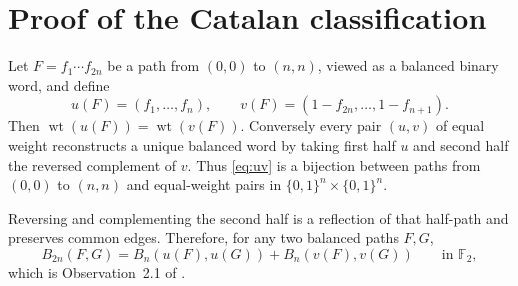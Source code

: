 \documentclass[11pt]{article}
\theoremstyle{definition}
\newcommand{\F}{\mathbb F}
\newcommand{\wt}{\operatorname{wt}}
\newcommand{\bits}{\{0,1\}}
\begin{document}
\section{Proof of the Catalan classification}

Let $F=f_1\cdots f_{2n}$ be a path from $(0,0)$ to $(n,n)$, viewed as a balanced binary word, and define
\begin{equation}\label{eq:uv}
 u(F)=(f_1,\ldots,f_n),\qquad
 v(F)=(1-f_{2n},\ldots,1-f_{n+1}).
\end{equation}
Then $\wt(u(F))=\wt(v(F))$.  Conversely every pair $(u,v)$ of equal weight reconstructs a unique balanced word by taking first half $u$ and second half the reversed complement of $v$.  Thus \eqref{eq:uv} is a bijection between paths from $(0,0)$ to $(n,n)$ and equal-weight pairs in $\bits^n\times\bits^n$.

Reversing and complementing the second half is a reflection of that half-path and preserves common edges.  Therefore, for any two balanced paths $F,G$,
\begin{equation}\label{eq:halfdecomp}
 B_{2n}(F,G)
 =B_n(u(F),u(G))+B_n(v(F),v(G))
 \qquad\text{in }\F_2,
\end{equation}
which is Observation~2.1 of \cite{Shankar}.
\end{document}
